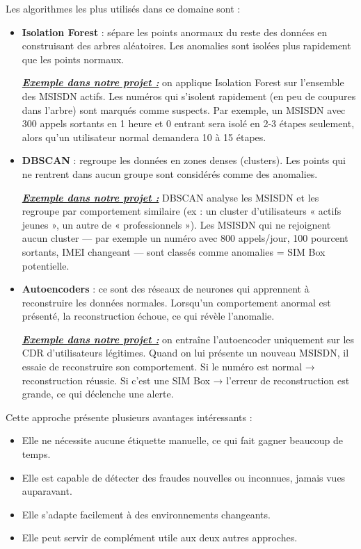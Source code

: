 \documentclass[12pt, oneside, a4paper]{report}
\begin{document}
Les algorithmes les plus utilisés dans ce domaine sont :
\begin{itemize}
\item \textbf{Isolation Forest} : sépare les points anormaux du reste des données en construisant des arbres aléatoires. Les anomalies sont isolées plus rapidement que les points normaux.

\underline{\textit{\textbf{Exemple dans notre projet :}}} on applique Isolation Forest sur l'ensemble des MSISDN actifs. Les numéros qui s'isolent rapidement (en peu de coupures dans l'arbre) sont marqués comme suspects. Par exemple, un MSISDN avec 300 appels sortants en 1 heure et 0 entrant sera isolé en 2-3 étapes seulement, alors qu'un utilisateur normal demandera 10 à 15 étapes.

\vspace{0.3cm}
\item \textbf{DBSCAN} : regroupe les données en zones denses (clusters). Les points qui ne rentrent dans aucun groupe sont considérés comme des anomalies.

\underline{\textit{\textbf{Exemple dans notre projet :}}} DBSCAN analyse les MSISDN et les regroupe par comportement similaire (ex : un cluster d'utilisateurs « actifs jeunes », un autre de « professionnels »). Les MSISDN qui ne rejoignent aucun cluster — par exemple un numéro avec 800 appels/jour, 100 pourcent sortants, IMEI changeant — sont classés comme anomalies = SIM Box potentielle.

\vspace{0.3cm}
\item \textbf{Autoencoders} : ce sont des réseaux de neurones qui apprennent à reconstruire les données normales. Lorsqu'un comportement anormal est présenté, la reconstruction échoue, ce qui révèle l'anomalie.

\underline{\textit{\textbf{Exemple dans notre projet :}}} on entraîne l'autoencoder uniquement sur les CDR d'utilisateurs légitimes. Quand on lui présente un nouveau MSISDN, il essaie de reconstruire son comportement. Si le numéro est normal → reconstruction réussie. Si c'est une SIM Box → l'erreur de reconstruction est grande, ce qui déclenche une alerte.
\end{itemize}

\vspace{0.3cm}
Cette approche présente plusieurs avantages intéressants :
\begin{itemize}
\item Elle ne nécessite aucune étiquette manuelle, ce qui fait gagner beaucoup de temps.
\item Elle est capable de détecter des fraudes nouvelles ou inconnues, jamais vues auparavant.
\item Elle s'adapte facilement à des environnements changeants.
\item Elle peut servir de complément utile aux deux autres approches.
\end{itemize}
\end{document}

